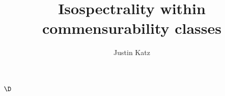 \documentclass[11pt]{amsart}
\title{Isospectrality within commensurability classes}
\author{Justin Katz}
\begin{document}
\maketitle
$\D$


\end{document}
